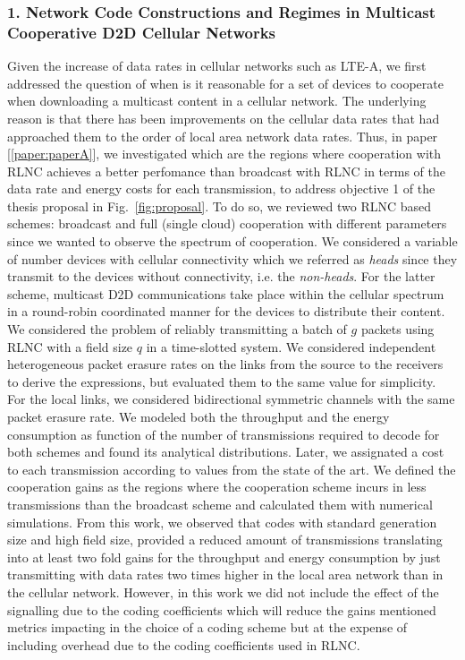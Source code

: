 \subsubsection{1. Network Code Constructions and Regimes in Multicast Cooperative D2D Cellular Networks}

Given the increase of data rates in cellular networks such as \ac{LTE-A}, we first addressed the question of when is it reasonable for a set of devices to cooperate when downloading a multicast content in a cellular network. The underlying reason is that there has been improvements on the cellular data rates that had approached them to the order of local area network data rates. Thus, in paper {[\ref{paper:paperA}]}, we investigated which are the regions where cooperation with \ac{RLNC} achieves a better perfomance than broadcast with \ac{RLNC} in terms of the data rate and energy costs for each transmission, to address objective 1 of the thesis proposal in Fig.~\ref{fig:proposal}. To do so, we reviewed two \ac{RLNC} based schemes: broadcast and full (single cloud) cooperation with different parameters since we wanted to observe the spectrum of cooperation. We considered a variable of number devices with cellular connectivity which we referred as \textit{heads} since they transmit to the devices without connectivity, i.e. the \textit{non-heads}. For the latter scheme, multicast \ac{D2D} communications take place within the cellular spectrum in a round-robin coordinated manner for the devices to distribute their content. We considered the problem of reliably transmitting a batch of $g$ packets using \ac{RLNC} with a field size $q$ in a time-slotted system. We considered independent heterogeneous packet erasure rates on the links from the source to the receivers to derive the expressions, but evaluated them to the same value for simplicity. For the local links, we considered bidirectional symmetric channels with the same packet erasure rate. We modeled both the throughput and the energy consumption as function of the number of transmissions required to decode for both schemes and found its analytical distributions. Later, we assignated a cost to each transmission according to values from the state of the art. We defined the cooperation gains as the regions where the cooperation scheme incurs in less transmissions than the broadcast scheme and calculated them with numerical simulations. From this work, we observed that codes with standard generation size and high field size, provided a reduced amount of transmissions translating into at least two fold gains for the throughput and energy consumption by just transmitting with data rates two times higher in the local area network than in the cellular network. However, in this work we did not include the effect of the signalling due to the coding coefficients which will reduce the gains mentioned metrics impacting in the choice of a coding scheme but at the expense of including overhead due to the coding coefficients used in \ac{RLNC}.

